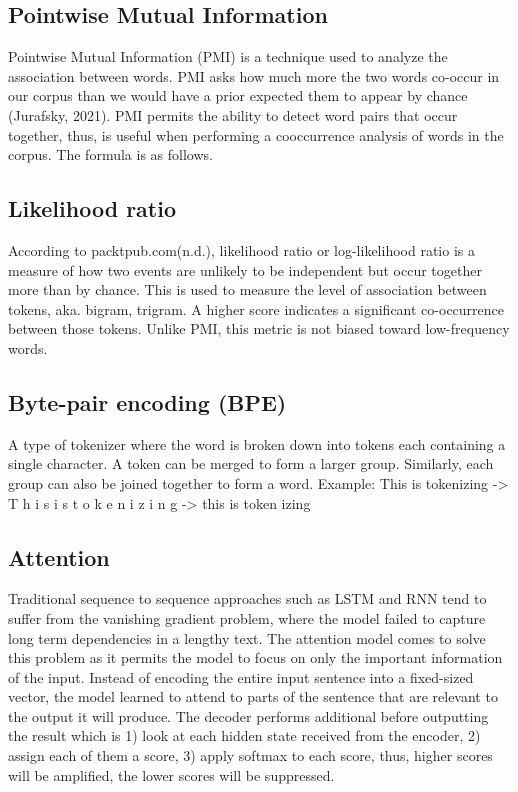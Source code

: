 \documentclass[12pt,oneside,openright,a4paper]{cpe-english-project}
\begin{document}
\subsection{Pointwise Mutual Information}
Pointwise Mutual Information (PMI) is a technique used to analyze the association between words. PMI asks how much more the two words co-occur in our corpus than we would have a prior expected them to appear by chance (Jurafsky, 2021). PMI permits the ability to detect word pairs that occur together, thus, is useful when performing a cooccurrence analysis of words in the corpus. The formula is as follows.

\subsection{Likelihood ratio}
	According to packtpub.com(n.d.), likelihood ratio or log-likelihood ratio is a measure of how two events are unlikely to be independent but occur together more than by chance. This is used to measure the level of association between tokens, aka. bigram, trigram. A higher score indicates a significant co-occurrence between those tokens. Unlike PMI, this metric is not biased toward low-frequency words.

\subsection{Byte-pair encoding (BPE)}
A type of tokenizer where the word is broken down into tokens each containing a single character. A token can be merged to form a larger group. Similarly, each group can also be joined together to form a word. 
Example: This is tokenizing -> T h i s i s t o k e n i z i n g -> this is token izing

\subsection{Attention}
Traditional sequence to sequence approaches such as LSTM and RNN tend to suffer from the vanishing gradient problem, where the model failed to capture long term dependencies in a lengthy text. The attention model comes to solve this problem as it permits the model to focus on only the important information of the input. Instead of encoding the entire input sentence into a fixed-sized vector, the model learned to attend to parts of the sentence that are relevant to the output it will produce.  The decoder performs additional before outputting the result which is 1) look at each hidden state received from the encoder, 2) assign each of them a score, 3) apply softmax to each score, thus, higher scores will be amplified, the lower scores will be suppressed.
\end{document}
